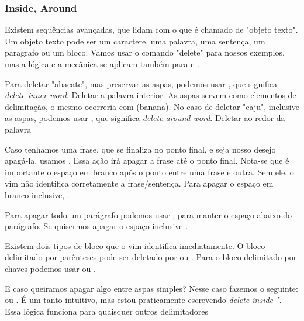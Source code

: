 \subsubsection{Inside, Around}
Existem sequências avançadas, que lidam com o que é chamado de "objeto texto".
Um objeto texto pode ser um caractere, uma palavra, uma sentença, um paragrafo ou um bloco.
Vamos usar o comando "delete" para nossos exemplos, mas a lógica e a mecânica se aplicam também
para  e .

Para deletar "abacate", mas preservar as aspas, podemos usar ,
que significa \textit{delete inner word}. Deletar a palavra interior.
As aspas servem como elementos de delimitação, o mesmo ocorreria com (banana).
No caso de deletar "caju", inclusive as aspas, podemos usar ,
que significa \textit{delete around word}. Deletar ao redor da palavra

Caso tenhamos uma frase, que se finaliza no ponto final,
e seja nosso desejo apagá-la, usamos .
Essa ação irá apagar a frase até o ponto final.
Nota-se que é importante o espaço em branco após o ponto entre uma frase e outra.
Sem ele, o vim não identifica corretamente a frase/sentença.
Para apagar o espaço em branco inclusive, . 

Para apagar todo um parágrafo podemos usar ,
para manter o espaço abaixo do parágrafo.
Se quisermos apagar o espaço inclusive .

Existem dois tipos de bloco que o vim identifica imediatamente.
O bloco delimitado por parênteses pode ser deletado por  ou .
Para o bloco delimitado por chaves podemos usar  ou .

E caso queiramos apagar algo entre aspas simples? Nesse caso fazemos o seguinte:
 ou .
É um tanto intuitivo, mas estou praticamente escrevendo \textit{delete inside "}.
Essa lógica funciona para quaisquer outros delimitadores

